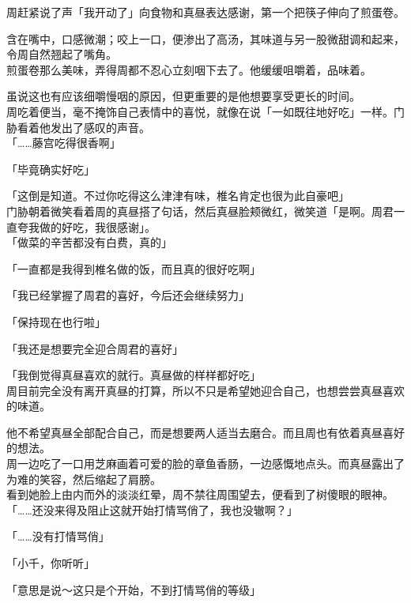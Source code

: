 周赶紧说了声「我开动了」向食物和真昼表达感谢，第一个把筷子伸向了煎蛋卷。

含在嘴中，口感微潮；咬上一口，便渗出了高汤，其味道与另一股微甜调和起来，令周自然翘起了嘴角。\\

煎蛋卷那么美味，弄得周都不忍心立刻咽下去了。他缓缓咀嚼着，品味着。

虽说这也有应该细嚼慢咽的原因，但更重要的是他想要享受更长的时间。\\

周吃着便当，毫不掩饰自己表情中的喜悦，就像在说「一如既往地好吃」一样。门胁看着他发出了感叹的声音。\\

「……藤宫吃得很香啊」

「毕竟确实好吃」

「这倒是知道。不过你吃得这么津津有味，椎名肯定也很为此自豪吧」\\

门胁朝着微笑看着周的真昼搭了句话，然后真昼脸颊微红，微笑道「是啊。周君一直夸我做的好吃，我很感谢」。\\

「做菜的辛苦都没有白费，真的」

「一直都是我得到椎名做的饭，而且真的很好吃啊」

「我已经掌握了周君的喜好，今后还会继续努力」

「保持现在也行啦」

「我还是想要完全迎合周君的喜好」

「我倒觉得真昼喜欢的就行。真昼做的样样都好吃」\\

周目前完全没有离开真昼的打算，所以不只是希望她迎合自己，也想尝尝真昼喜欢的味道。

他不希望真昼全部配合自己，而是想要两人适当去磨合。而且周也有依着真昼喜好的想法。\\

周一边吃了一口用芝麻画着可爱的脸的章鱼香肠，一边感慨地点头。而真昼露出了为难的笑容，然后缩起了肩膀。\\

看到她脸上由内而外的淡淡红晕，周不禁往周围望去，便看到了树傻眼的眼神。\\

「……还没来得及阻止这就开始打情骂俏了，我也没辙啊？」

「……没有打情骂俏」

「小千，你听听」

「意思是说～这只是个开始，不到打情骂俏的等级」

